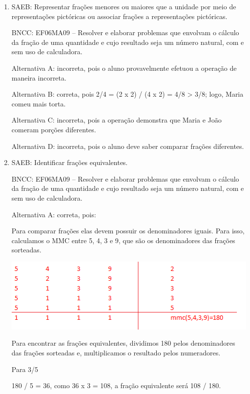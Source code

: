 
	\begin{enumerate}

		\item SAEB: Representar frações menores ou maiores que a unidade por meio de
representações pictóricas ou associar frações a representações
pictóricas.

BNCC: EF06MA09 -- Resolver e elaborar problemas que envolvam o cálculo
da fração de uma quantidade e cujo resultado seja um número natural, com
e sem uso de calculadora.

Alternativa A: incorreta, pois o aluno provavelmente efetuou a operação
de maneira incorreta.

Alternativa B: correta, pois 2/4 = (2 x 2) / (4 x 2) = 4/8
\textgreater{} 3/8; logo, Maria comeu mais torta.

Alternativa C: incorreta, pois a operação demonstra que Maria e João
comeram porções diferentes.

Alternativa D: incorreta, pois o aluno deve saber comparar frações
diferentes.

		\item SAEB: Identificar frações equivalentes.

BNCC: EF06MA09 -- Resolver e elaborar problemas que envolvam o cálculo
da fração de uma quantidade e cujo resultado seja um número natural, com
e sem uso de calculadora.

Alternativa A: correta, pois:

Para comparar frações elas devem possuir os denominadores iguais. Para
isso, calculamos o MMC entre 5, 4, 3 e 9, que são os denominadores das
frações sorteadas.

\includegraphics[width=5.01042in,height=1.44792in]{./imgSAEB_6_MAT/media/image36.png}

Para encontrar as frações equivalentes, dividimos 180 pelos
denominadores das frações sorteadas e, multiplicamos o resultado pelos
numeradores.

Para 3/5

180 / 5 = 36, como 36 x 3 = 108, a fração equivalente será 108 / 180.


\end{enumerate}
